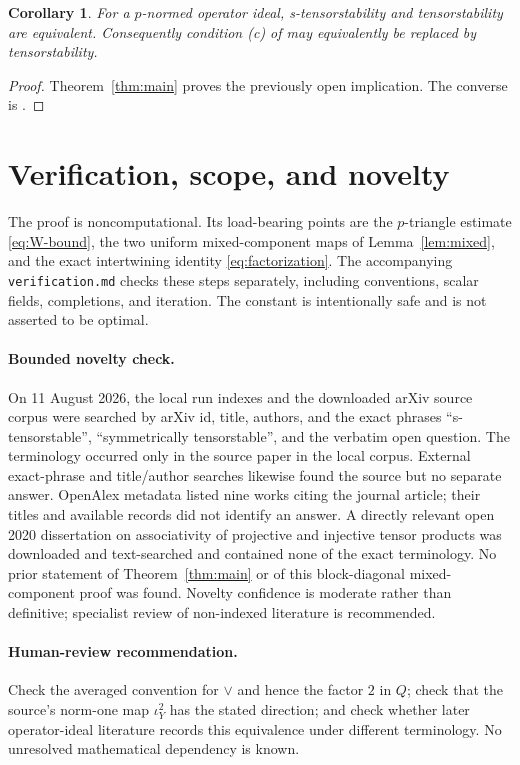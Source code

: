 \documentclass[11pt]{article}
\newtheorem{corollary}{Corollary}
\begin{document}
\begin{corollary}
For a $p$-normed operator ideal, s-tensorstability and tensorstability are
equivalent. Consequently condition (c) of
\cite[Theorem~7.8]{BT2018} may equivalently be replaced by tensorstability.
\end{corollary}

\begin{proof}
Theorem~\ref{thm:main} proves the previously open implication. The converse
is \cite[Proposition~7.12]{BT2018}.
\end{proof}

\section{Verification, scope, and novelty}

The proof is noncomputational. Its load-bearing points are the $p$-triangle
estimate \eqref{eq:W-bound}, the two uniform mixed-component maps of
Lemma~\ref{lem:mixed}, and the exact intertwining identity
\eqref{eq:factorization}. The accompanying \texttt{verification.md} checks
these steps separately, including conventions, scalar fields, completions,
and iteration. The constant is intentionally safe and is not asserted to be
optimal.

\paragraph{Bounded novelty check.}
On 11 August 2026, the local run indexes and the downloaded arXiv source
corpus were searched by arXiv id, title, authors, and the exact phrases
``s-tensorstable'', ``symmetrically tensorstable'', and the verbatim open
question. The terminology occurred only in the source paper in the local
corpus. External exact-phrase and title/author searches likewise found the
source but no separate answer. OpenAlex metadata listed nine works citing
the journal article; their titles and available records did not identify an
answer. A directly relevant open 2020 dissertation on associativity of
projective and injective tensor products was downloaded and text-searched and
contained none of the exact terminology. No prior statement of
Theorem~\ref{thm:main} or of this block-diagonal mixed-component proof was
found. Novelty confidence is moderate rather than definitive; specialist
review of non-indexed literature is recommended.

\paragraph{Human-review recommendation.}
Check the averaged convention for $\vee$ and hence the factor $2$ in $Q$;
check that the source's norm-one map $\iota_Y^2$ has the stated direction;
and check whether later operator-ideal literature records this equivalence
under different terminology. No unresolved mathematical dependency is known.
\end{document}
